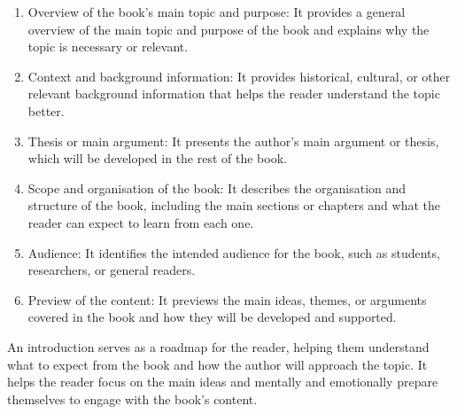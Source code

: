 \documentclass[12pt, twoside, a4paper]{book}
\begin{document}
\begin{enumerate}
    \item Overview of the book's main topic and purpose: It provides a general overview of the main topic and purpose of the book and explains why the topic is necessary or relevant.

    \item Context and background information: It provides historical, cultural, or other relevant background information that helps the reader understand the topic better.

    \item Thesis or main argument: It presents the author's main argument or thesis, which will be developed in the rest of the book.

    \item Scope and organisation of the book: It describes the organisation and structure of the book, including the main sections or chapters and what the reader can expect to learn from each one.

    \item Audience: It identifies the intended audience for the book, such as students, researchers, or general readers.

    \item Preview of the content: It previews the main ideas, themes, or arguments covered in the book and how they will be developed and supported.

\end{enumerate}

An introduction serves as a roadmap for the reader, helping them understand what to expect from the book and how the author will approach the topic. It helps the reader focus on the main ideas and mentally and emotionally prepare themselves to engage with the book's content.
\end{document}

